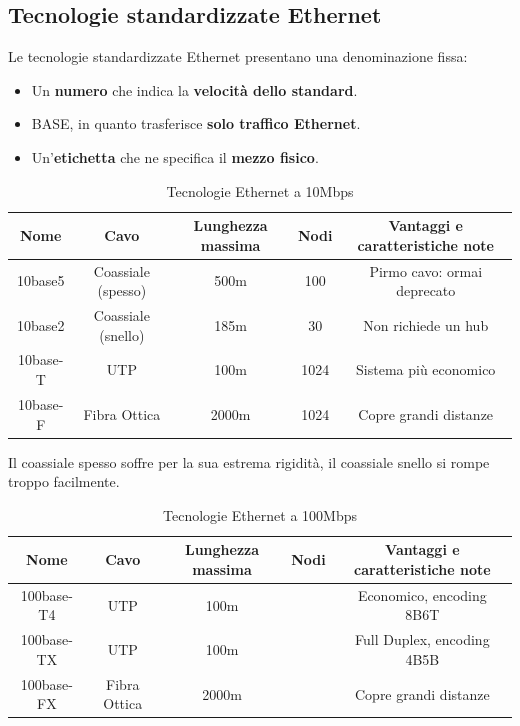 \subsection{Tecnologie standardizzate Ethernet}
Le tecnologie standardizzate Ethernet presentano una denominazione fissa:
\begin{itemize}
	\item Un \textbf{numero} che indica la \textbf{velocità dello standard}.
	\item BASE, in quanto trasferisce \textbf{solo traffico Ethernet}.
	\item Un'\textbf{etichetta} che ne specifica il \textbf{mezzo fisico}.
\end{itemize}
\begin{table}[htp]
	\centering
	\begin{tabular}{|c|c|c|c|c|}
		\hline
		Nome & Cavo & Lunghezza massima & Nodi & Vantaggi e caratteristiche note\\
		\hline
		10base5 & Coassiale (spesso) & 500m & 100 & Pirmo cavo: ormai deprecato\\
		\hline
		10base2 & Coassiale (snello)& 185m & 30 & Non richiede un hub\\
		\hline
		10base-T & UTP & 100m & 1024 & Sistema più economico\\
		\hline
		10base-F & Fibra Ottica & 2000m & 1024 & Copre grandi distanze\\
		\hline
	\end{tabular}
	\caption{Tecnologie Ethernet a 10Mbps}
\end{table}

Il coassiale spesso soffre per la sua estrema rigidità, il coassiale snello si rompe troppo facilmente.

\begin{table}[htp]
	\centering
	\begin{tabular}{|c|c|c|c|c|}
		\hline
		Nome & Cavo & Lunghezza massima & Nodi & Vantaggi e caratteristiche note\\
		\hline
		100base-T4 & UTP & 100m &  & Economico, encoding 8B6T\\
		\hline
		100base-TX & UTP & 100m &  & Full Duplex, encoding 4B5B\\
		\hline
		100base-FX & Fibra Ottica & 2000m &  & Copre grandi distanze\\
		\hline
	\end{tabular}
	\caption{Tecnologie Ethernet a 100Mbps}
\end{table}

